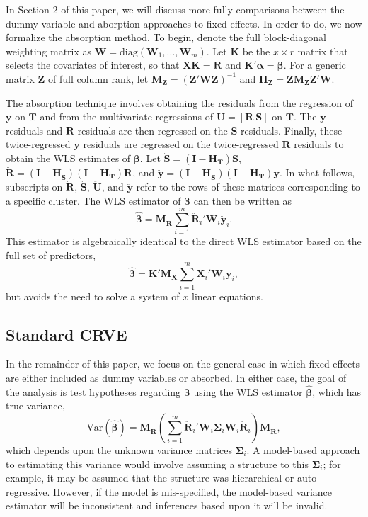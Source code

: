 \documentclass[12pt]{article}\usepackage[]{graphicx}\usepackage[]{color}
\newcommand{\Var}{\text{Var}}
\newcommand{\bm}{\mathbf}
\newcommand{\bs}{\boldsymbol}
\begin{document}
In Section 2 of this paper, we will discuss more fully comparisons between the dummy variable and aborption approaches to fixed effects. 
In order to do, we now formalize the absorption method.
To begin, denote the full block-diagonal weighting matrix as $\bm{W} = \text{diag}\left(\bm{W}_1,...,\bm{W}_m\right)$.
Let $\bm{K}$ be the $x \times r$ matrix that selects the covariates of interest, so that $\bm{X} \bm{K} = \bm{R}$ and $\bm{K}'\bs\alpha = \bs\beta$.
For a generic matrix $\bm{Z}$ of full column rank, let $\bm{M_Z} = \left(\bm{Z}'\bm{W}\bm{Z}\right)^{-1}$ and $\bm{H_Z} = \bm{Z}\bm{M_Z}\bm{Z}'\bm{W}$. 

The absorption technique involves obtaining the residuals from the regression of $\bm{y}$ on $\bm{T}$ and from the multivariate regressions of $\bm{U} = [\bm{R}\ \bm{S}]$ on $\bm{T}$. 
The $\bm{y}$ residuals and $\bm{R}$ residuals are then regressed on the $\bm{S}$ residuals. 
Finally, these twice-regressed $\bm{y}$ residuals are regressed on the twice-regressed $\bm{R}$ residuals to obtain the WLS estimates of $\bs\beta$. 
Let $\bm{\ddot{S}} = \left(\bm{I} - \bm{H_T}\right)\bm{S}$, $\bm{\ddot{R}} = \left(\bm{I} - \bm{H_{\ddot{S}}}\right)\left(\bm{I} - \bm{H_T}\right)\bm{R}$, and $\bm{\ddot{y}} = \left(\bm{I} - \bm{H_{\ddot{S}}}\right)\left(\bm{I} - \bm{H_T}\right)\bm{y}$. 
In what follows, subscripts on $\bm{\ddot{R}}$, $\bm{\ddot{S}}$,  $\bm{\ddot{U}}$, and $\bm{\ddot{y}}$ refer to the rows of these matrices corresponding to a specific cluster. 
The WLS estimator of $\bs\beta$ can then be written as
\begin{equation}
\label{eq:WLS}
\bs{\hat\beta} = \bm{M_{\ddot{R}}} \sum_{i=1}^m \bm{\ddot{R}}_i' \bm{W}_i \bm{\ddot{y}}_i. 
\end{equation}
This estimator is algebraically identical to the direct WLS estimator based on the full set of predictors, \[
\bs{\hat\beta} = \bm{K}'\bm{M_X} \sum_{i=1}^m \bm{X}_i' \bm{W}_i \bm{y}_i,
\]
but avoids the need to solve a system of $x$ linear equations.

\subsection{Standard CRVE}

In the remainder of this paper, we focus on the general case in which fixed effects are either included as dummy variables or absorbed. 
In either case, the goal of the analysis is test hypotheses regarding $\bs\beta$ using the WLS estimator $\bs{\hat\beta}$, which has true variance,
\begin{equation}
\label{eq:var_WLS}
\Var\left(\bs{\hat\beta}\right) = \bm{M_{\ddot{R}}}\left(\sum_{i=1}^m \bm{\ddot{R}}_i' \bm{W}_i \bs\Sigma_i \bm{W}_i\bm{\ddot{R}}_i\right) \bm{M_{\ddot{R}}},
\end{equation}
which depends upon the unknown variance matrices $\bm\Sigma_i$. 
A model-based approach to estimating this variance would involve assuming a structure to this $\bm\Sigma_i$; for example, it may be assumed that the structure was hierarchical or auto-regressive. 
However, if the model is mis-specified, the model-based variance estimator will be inconsistent and inferences based upon it will be invalid.
\end{document}

